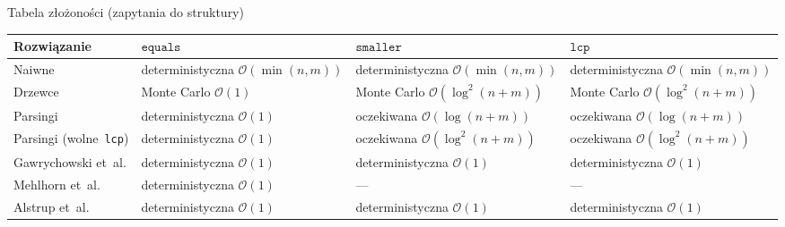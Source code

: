 \documentclass[polish]{beamer}
\begin{document}
\begin{frame}{Tabela złożoności (zapytania do struktury)}
    \begin{lrbox}{\secondbox}
        \begin{tabular}{ | m{3.5cm} | >{\centering\arraybackslash}m{2.8cm} | >{\centering\arraybackslash}m{2.8cm} | >{\centering\arraybackslash}m{2.8cm} | }
            \hline
            Rozwiązanie & $\texttt{equals}$ & $\texttt{smaller}$ & $\texttt{lcp}$ \\
            \hline
            Naiwne & deterministyczna $\mathcal{O}(\min(n, m))$ & deterministyczna $\mathcal{O}(\min(n, m))$ & deterministyczna $\mathcal{O}(\min(n, m))$ \\
            \hline
            Drzewce & Monte Carlo $\mathcal{O}(1)$ & Monte Carlo $\mathcal{O}(\log^2(n + m))$ & Monte Carlo $\mathcal{O}(\log^2(n + m))$ \\
            \hline
            Parsingi & deterministyczna $\mathcal{O}(1)$ & oczekiwana $\mathcal{O}(\log(n + m))$ & oczekiwana $\mathcal{O}(\log(n + m))$ \\
            \hline
            Parsingi (wolne~\texttt{lcp}) & deterministyczna $\mathcal{O}(1)$ & oczekiwana $\mathcal{O}(\log^2(n + m))$ & oczekiwana $\mathcal{O}(\log^2(n + m))$ \\
            \hline
            Gawrychowski et~al. & deterministyczna $\mathcal{O}(1)$ & deterministyczna $\mathcal{O}(1)$ & deterministyczna $\mathcal{O}(1)$ \\
            \hline
            Mehlhorn et~al. & deterministyczna $\mathcal{O}(1)$ & --- & ---\\
            \hline
            Alstrup et~al. & deterministyczna $\mathcal{O}(1)$ & deterministyczna $\mathcal{O}(1)$ & deterministyczna $\mathcal{O}(1)$ \\
            \hline
        \end{tabular}
    \end{lrbox}
    \begin{center}
        \scalebox{0.8}{\usebox{\secondbox}}
    \end{center}
\end{frame}

\newsavebox{\thirdbox}
\end{document}
